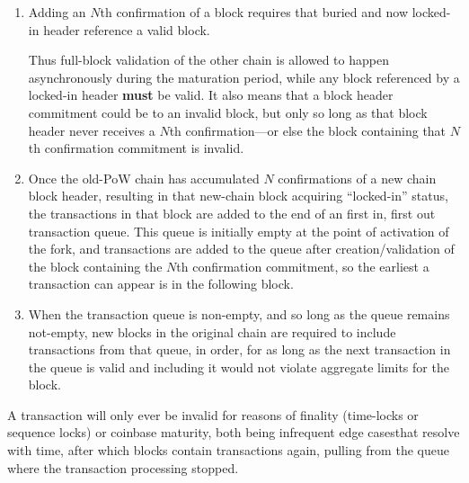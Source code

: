 \begin{enumerate}
  \item

    Adding an $N$th confirmation of a block requires that buried and
    now locked-in header reference a valid block.


Thus full-block validation of the other chain is allowed to happen
asynchronously during the maturation period, while any block
referenced by a locked-in header \textbf{must} be valid.  It also
means that a block header commitment could be to an invalid block, but
only so long as that block header never receives a $N$th
confirmation---or else the block containing that $N$th confirmation
commitment is invalid.


  \item

    Once the old-PoW chain has accumulated $N$ confirmations of a new
    chain block header, resulting in that new-chain block acquiring
    ``locked-in'' status, the transactions in that block are added to
    the end of an first in, first out transaction queue.  This queue
    is initially empty at the point of activation of the fork, and
    transactions are added to the queue after creation/validation of
    the block containing the $N$th confirmation commitment, so the
    earliest a transaction can appear is in the following block.

  \item

    When the transaction queue is non-empty, and so long as the queue
    remains not-empty, new blocks in the original chain are required
    to include transactions from that queue, in order, for as long as
    the next transaction in the queue is valid and including it would
    not violate aggregate limits for the block.

\end{enumerate}

A transaction will only ever be invalid for reasons of finality
(time-locks or sequence locks) or coinbase maturity, both being
infrequent edge cases\footnotemark that resolve with time, after which
blocks contain transactions again, pulling from the queue where the
transaction processing stopped.


